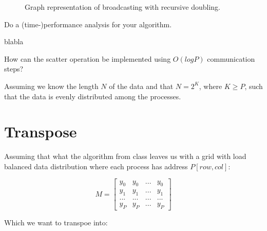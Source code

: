 \documentclass[a4paper]{exam}
\begin{document}
\begin{questions}
\begin{figure}
\caption{Graph representation of broadcasting with recursive doubling.}
\label{graph}
\end{figure}





\addpoints \question Do a (time-)performance analysis for your algorithm.

\begin{solution}
  blabla
\end{solution}

\addpoints \question How can the scatter operation be implemented using $O(log P)$ communication steps?

\begin{solution}
Assuming we know the length $N$ of the data and that $N=2^K$, where $K\geq P$, such that the data is evenly distributed among the processes.
\end{solution}

\section{Transpose}
\begin{solution}
  Assuming that what the algorithm from class leaves us with a grid with load balanced data distribution where each process has address $P[row,col]$:

  \begin{equation*}
    M =
    \begin{bmatrix}
      y_0 & y_0 & ... & y_0 \\
      y_1 & y_1 & ... & y_1 \\
      ... & ... & ... & ... \\
      y_P & y_P & ... & y_P
    \end{bmatrix}
  \end{equation*}

  Which we want to transpoe into:


\end{solution}
\end{questions}
\end{document}

